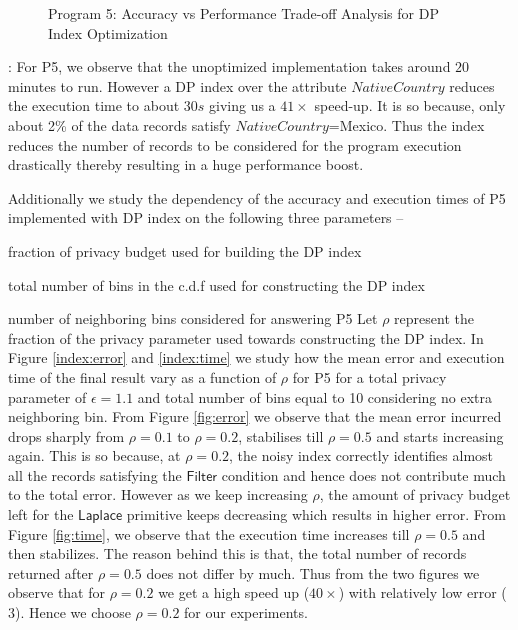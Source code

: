\begin{figure}[ht]
\begin{subfigure}[b]{0.45\linewidth}
        \caption{}
        \label{fig:time:NeighboringBins}
        \end{subfigure}
        \caption{Program 5: Accuracy vs Performance Trade-off Analysis for DP Index Optimization }\label{index}
    \end{figure}


: For P5, we observe that the unoptimized implementation takes around $20$ minutes to run. However  a DP index over the attribute $NativeCountry$  reduces the execution time to about $30s$ giving us a $41\times $ speed-up. It is so because, only about 2\% of the data records satisfy $NativeCountry$=Mexico. Thus the index reduces the number of records to be considered for the program execution drastically thereby resulting in a huge performance boost. %

Additionally we study the dependency of the accuracy and execution times of P5 implemented with DP index on the following three parameters -- \squishlist \item fraction of privacy budget used for building the DP index \item total number of bins in the c.d.f used for constructing the DP index \item number of neighboring bins considered for answering P5\squishend
Let $\rho$ represent the fraction of the privacy parameter used towards constructing the DP index. In Figure \ref{index:error} and \ref{index:time} we study how the mean error and execution time of the final result vary as a function of $\rho$ for P5 for a total privacy parameter of $\epsilon=1.1$ and total number of bins equal to 10 considering no extra neighboring bin.  From Figure \ref{fig:error} we observe that the mean error incurred drops sharply from $\rho=0.1$ to $\rho=0.2$, stabilises till $\rho=0.5$ and starts increasing again. This is so because, at $\rho=0.2$, the noisy index correctly identifies almost all the records satisfying the $\textsf{Filter}$ condition and hence does not contribute much to the total error. However as we keep increasing $\rho$, the amount of privacy budget left for the $\textsf{Laplace}$ primitive keeps decreasing which results in higher error. From Figure \ref{fig:time}, we observe that the execution time increases till $\rho=0.5$ and then stabilizes. The reason behind this is that, the total number of records returned after $\rho=0.5$ does not differ by much. Thus from the two figures we observe that for $\rho=0.2$ we get a high speed up ($40\times$) with relatively low error ($3$). Hence we choose $\rho=0.2$ for our experiments. %


